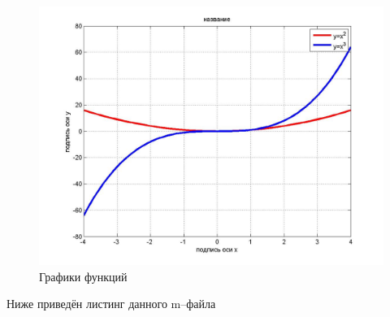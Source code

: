 \begin{figure}[!h]\center
\captionsetup{singlelinecheck=true}
\includegraphics*[scale=0.4]{./about/matlab/matlab_figure_002}
\caption{Графики функций} \label{matlab_figure_002}
\end{figure}

Ниже приведён листинг данного m--файла





